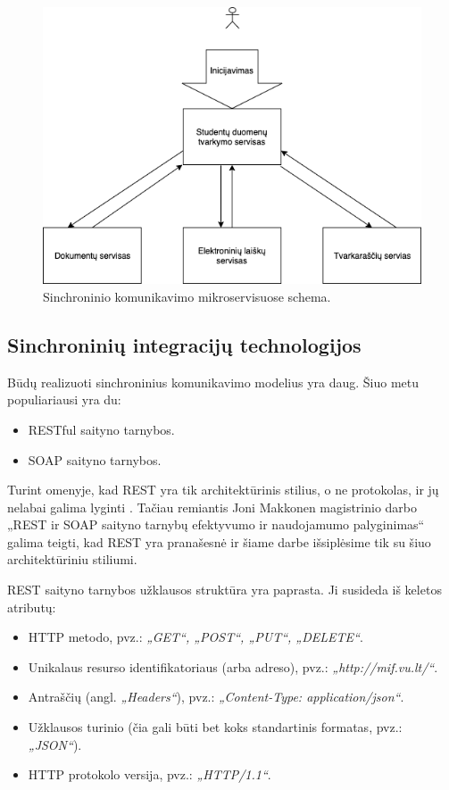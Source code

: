\begin{figure}[H]
  \centering
  \includegraphics[scale=0.6]{img/synchronous-microservices-scheme}
  \caption{Sinchroninio komunikavimo mikroservisuose schema.}
  \label{img:synchronous-microservices-scheme}
\end{figure}

\subsection{Sinchroninių integracijų technologijos}
Būdų realizuoti sinchroninius komunikavimo modelius yra daug. Šiuo metu populiariausi yra du:
\begin{itemize}
	\item RESTful saityno tarnybos.
	\item SOAP saityno tarnybos.
\end{itemize}
\break

Turint omenyje, kad REST yra tik architektūrinis stilius, o ne protokolas, ir jų nelabai galima lyginti \cite{Misc5}. Tačiau
remiantis Joni Makkonen magistrinio darbo „REST ir SOAP saityno tarnybų efektyvumo ir naudojamumo palyginimas“ \cite{MstrThs2} galima teigti, kad
REST yra pranašesnė ir šiame darbe išsiplėsime tik su šiuo architektūriniu stiliumi.
\break

REST saityno tarnybos užklausos struktūra yra paprasta. Ji susideda iš keletos atributų:
\begin{itemize}
	\item HTTP metodo, pvz.: \textit{„GET“, „POST“, „PUT“, „DELETE“}.
	\item Unikalaus resurso identifikatoriaus (arba adreso), pvz.: \textit{„http://mif.vu.lt/“}.
	\item Antraščių (angl. \textit{„Headers“}), pvz.: \textit{„Content-Type: application/json“}.
	\item Užklausos turinio (čia gali būti bet koks standartinis formatas, pvz.: \textit{„JSON“}).
	\item HTTP protokolo versija, pvz.: \textit{„HTTP/1.1“}.
\end{itemize}

